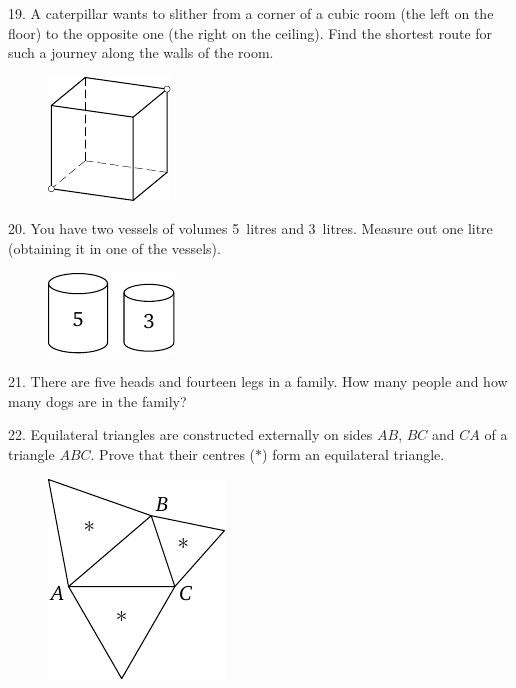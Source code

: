 \begin{problem}{19.}
	A caterpillar wants to slither from a corner of a cubic room (the left on the floor) to the opposite one
	(the right on the ceiling).
	Find the shortest route for such a journey along the walls of the room.
	\begin{figure}
		\includegraphics{taskbook-3}
	\end{figure}
\end{problem}

\begin{problem}{20.}
	You have two vessels of volumes 5~litres and 3~litres. Measure out one litre (obtaining it in one of the vessels).
	\begin{figure}
		\includegraphics{taskbook-4}
	\end{figure}
\end{problem}

\begin{problem}{21.}
	There are five heads and fourteen legs in a family. How many people and how many dogs are in the family?
\end{problem}

\begin{problem}{22.}
	Equilateral triangles are constructed externally on sides $AB$, $BC$ and $CA$ of a triangle $ABC$.
	Prove that their centres ($*$) form an equilateral triangle.
	\begin{figure}
		\includegraphics{taskbook-6}
	\end{figure}
\end{problem}

